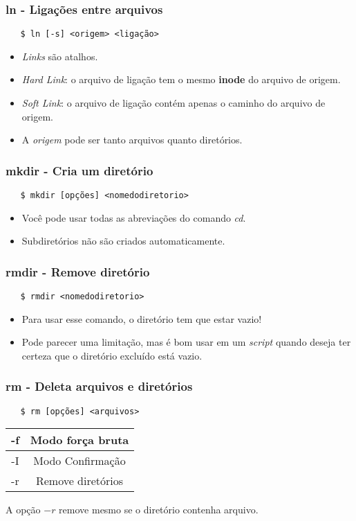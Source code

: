 \documentclass{beamer}
\begin{document}
\begin{frame}[fragile]
   \frametitle{ln - Ligações entre arquivos}
   \begin{verbatim}
   $ ln [-s] <origem> <ligação>
   \end{verbatim}
   \begin{itemize}
      \item \textit{Links} são atalhos.
      \item \textit{Hard Link}: o arquivo de ligação tem o mesmo \textbf{inode} do arquivo de origem.
      \item \textit{Soft Link}: o arquivo de ligação contém apenas o caminho do arquivo de origem.
      \item A \textit{origem} pode ser tanto arquivos quanto diretórios.
   \end{itemize}
\end{frame}

\begin{frame}[fragile]
   \frametitle{mkdir - Cria um diretório}
   \begin{verbatim}
   $ mkdir [opções] <nomedodiretorio>
   \end{verbatim}
   \begin{itemize}
      \item Você pode usar todas as abreviações do comando \textit{cd}.
      \item Subdiretórios não são criados automaticamente.
   \end{itemize}
\end{frame}

\begin{frame}[fragile]
   \frametitle{rmdir - Remove diretório}
   \begin{verbatim}
   $ rmdir <nomedodiretorio>
   \end{verbatim}
   \begin{itemize}
      \item Para usar esse comando, o diretório tem que estar vazio!
      \item Pode parecer uma limitação, mas é bom usar em um \textit{script} quando deseja ter certeza que o diretório excluído está vazio.
   \end{itemize}
\end{frame}

\begin{frame}[fragile]
   \frametitle{rm - Deleta arquivos e diretórios}
   \begin{verbatim}
   $ rm [opções] <arquivos>
   \end{verbatim}
   \begin{table}
      \begin{tabular}{ c | c }
         -f & Modo força bruta \\
         \hline 
         -I & Modo Confirmação \\
         \hline
         -r & Remove diretórios \\
      \end{tabular}
   \end{table}
   A opção $-r$ remove mesmo se o diretório contenha arquivo.
\end{frame}
\end{document}
